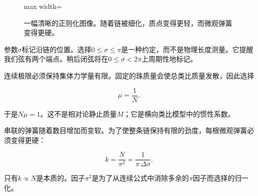\begin{figure}[H]
  \centering
  \begin{adjustbox}{max width=\linewidth}
  \end{adjustbox}
  \caption{一幅清晰的正则化图像。随着链被细化，质点变得更轻，而微观弹簧变得更硬。}
  \label{fig:l02-chain-redraw}
\end{figure}

参数\(\sigma\)标记沿链的位置。选择\(0\leq\sigma\leq\pi\)是一种约定，而不是物理长度测量。它提醒我们弦有两个端点。稍后闭弦将在\(0\leq\sigma<2\pi\)上周期性地标记。

连续极限必须保持集体力学量有限。固定的珠质量会使总类比质量发散，因此选择

\begin{equation}
  \mu=\frac{1}{N}.
  \label{eq:l02-mu-scaling}
\end{equation}

于是\(N\mu=1\)。这不是相对论静止质量\(M\)；它是横向类比模型中的惯性系数。

串联的弹簧随着数目增加而变软。为了使整条链保持有限的劲度，每根微观弹簧必须变得更硬：

\begin{equation}
  k=\frac{N}{\pi^2}
  =\frac{1}{\pi\,\Delta\sigma}.
  \label{eq:l02-k-scaling}
\end{equation}

只有\(k\propto N\)是本质的。因子\(\pi^2\)是为了从连续公式中消除多余的\(\pi\)因子而选择的归一化。

\begin{classroomqa}
\end{classroomqa}


